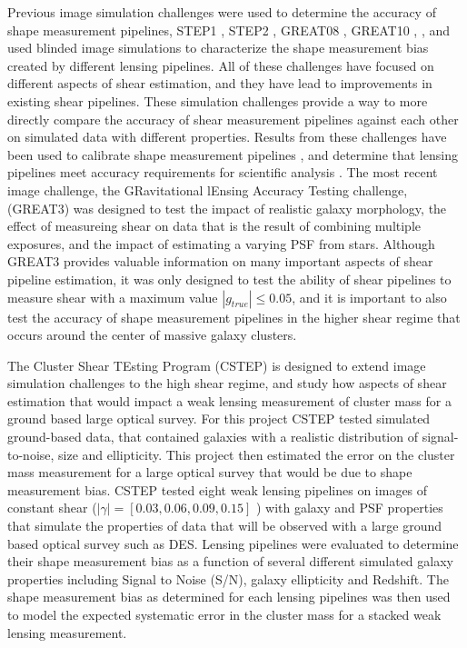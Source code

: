 \documentclass[useAMS,usenatbib]{mn2e}
\begin{document}
\indent Previous image simulation challenges were used to determine
the accuracy of shape measurement pipelines, STEP1 \citep{STEP1},
STEP2 \citep{STEP2}, GREAT08 \citep{GREAT08}, GREAT10
\citep{GREAT10}, \citep{great3}, and used blinded image
simulations to characterize the shape measurement bias created by
different lensing pipelines. All of these challenges have focused on
different aspects of shear estimation, and they have lead to
improvements in existing shear pipelines. These simulation challenges provide a way to
more directly compare the accuracy of shear measurement pipelines against each other
on simulated data with different properties. Results from these challenges have been
used to calibrate shape measurement pipelines \citep[e.g.][]{Apple},
and determine that lensing pipelines meet accuracy requirements for scientific
analysis \citep[e.g.][]{Berge}. The most recent image challenge, the
GRavitational lEnsing Accuracy Testing challenge, (GREAT3) was
designed to test the impact of realistic galaxy morphology, the effect
of measureing shear on data that is the result of combining multiple
exposures, and the impact of estimating a varying PSF from
stars. Although GREAT3 provides valuable information on many important
aspects of shear pipeline estimation, it was only designed to test the ability of shear
pipelines to measure shear with a maximum value $|g_{true}| \leq 0.05
$, and it is important to also test the accuracy of shape measurement
pipelines in the higher shear regime that occurs around the center of
massive galaxy clusters.

\indent
The Cluster Shear TEsting Program (CSTEP) is designed to extend image
simulation challenges to the high shear regime, and study how aspects of
shear estimation that would impact a weak lensing measurement of
cluster mass for a ground based large optical survey. For this project CSTEP tested
simulated ground-based data, that contained galaxies with a realistic
distribution of signal-to-noise, size and ellipticity. This project
then estimated the error on the cluster mass measurement for a
large optical survey that would be due to shape measurement bias.
CSTEP tested eight weak lensing pipelines on images of constant shear
($|\gamma| = [0.03, 0.06, 0.09, 0.15]$ ) with galaxy and PSF properties that simulate the properties
of data that will be observed with a large ground based optical survey
such as DES. Lensing pipelines
were evaluated to determine their shape measurement bias as a function
of several different simulated galaxy properties including Signal to
Noise (S/N), galaxy ellipticity and Redshift. The shape measurement bias as 
determined for each lensing pipelines was then used to model the 
expected systematic error in the cluster mass for a stacked weak lensing measurement.
\end{document}
